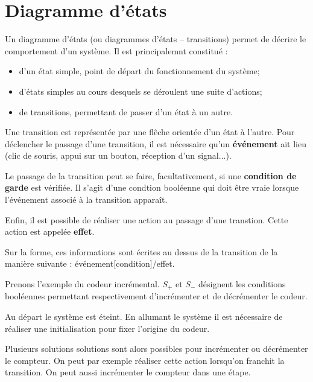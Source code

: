 \setchapterpreamble[u]{\margintoc}
\chapter{Diagramme d'états}


Un diagramme d'états (ou diagrammes d'états -- transitions) permet de décrire le comportement d'un système. 
Il est principalemnt constitué :
\begin{itemize}
\item d'un état simple, point de départ du fonctionnement du système;
\item d'états simples au cours desquels se déroulent une suite d'actions;
\item de transitions, permettant de passer d'un état à un autre.
\end{itemize}

Une transition est représentée par une flêche orientée d'un état à l'autre.  Pour déclencher le passage d'une transition, il est nécessaire qu'un \textbf{événement} ait lieu (clic de souris, appui sur un bouton, réception d'un signal...).  

Le passage de la transition peut se faire, facultativement, si une \textbf{condition de garde} est vérifiée. Il s'agit d'une condtion booléenne qui doit être vraie lorsque l'événement associé à la transition apparaît.

Enfin, il est possible de réaliser une action au passage d'une transtion. Cette action est appelée \textbf{effet}.

Sur la forme, ces informations sont écrites au dessus de la transition de la manière suivante : 
événement[condition]/effet.


Prenons l'exemple du codeur incrémental. $S_{+}$ et $S_{-}$ désignent les conditions booléennes permettant respectivement d'incrémenter et de décrémenter le codeur.

Au départ le système est éteint. En allumant le système il est nécessaire de réaliser une initialisation pour fixer l'origine du codeur. 


Plusieurs solutions solutions sont alors possibles pour incrémenter ou décrémenter le compteur. On peut par exemple réaliser cette action lorsqu'on franchit la transition. On peut aussi incrémenter le compteur dans une étape.
